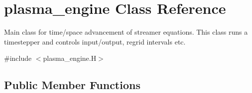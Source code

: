\hypertarget{classplasma__engine}{}\section{plasma\+\_\+engine Class Reference}
\label{classplasma__engine}


Main class for time/space advancement of streamer equations. This class runs a timestepper and controls input/output, regrid intervals etc.  




{\ttfamily \#include $<$plasma\+\_\+engine.\+H$>$}

\subsection*{Public Member Functions}
